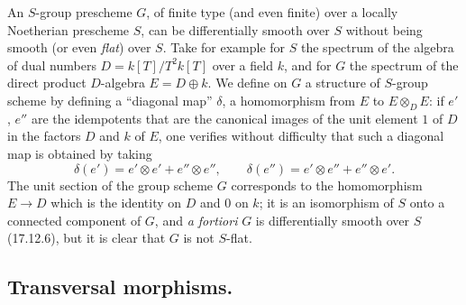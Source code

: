 \begin{remark}[17.12.8]
\label{IV.17.12.8}
An $S$-group prescheme $G$, of finite type (and even finite) over a locally Noetherian prescheme $S$, can be differentially smooth over $S$ without being smooth (or even \emph{flat}) over $S$. Take for example for $S$ the spectrum of the algebra of dual numbers $D=k[T]/T^2k[T]$ over a field $k$, and for $G$ the spectrum of the direct product $D$-algebra $E=D\oplus k$. We define on $G$ a structure of $S$-group scheme by defining a ``diagonal map'' $\delta$, a homomorphism from $E$ to $E\otimes_DE$: if $e'$, $e''$ are the idempotents that are the canonical images of the unit element $1$ of $D$ in the factors $D$ and $k$ of $E$, one verifies without difficulty that such a diagonal map is obtained by taking
\[
\delta(e')=e'\otimes e'+e''\otimes e'',\qquad
\delta(e'')=e'\otimes e''+e''\otimes e'.
\]
The unit section of the group scheme $G$ corresponds to the homomorphism $E\to D$ which is the identity on $D$ and $0$ on $k$; it is an isomorphism of $S$ onto a connected component of $G$, and \emph{a fortiori} $G$ is differentially smooth over $S$ (17.12.6), but it is clear that $G$ is not $S$-flat.
\end{remark}


\subsection{Transversal morphisms.}
\label{IV.17.13}

